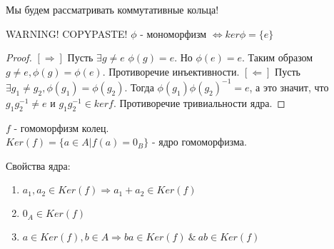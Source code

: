 Мы будем рассматривать коммутативные кольца!

\begin{thm}
WARNING! COPYPASTE!
$ \phi $ - мономорфизм $ \Leftrightarrow ker \phi = \{e\} $
\end{thm}
\begin{proof}
  $ [\Rightarrow] $ Пусть $ \exists g \ne e $ $ \phi(g) = e $. Но $ \phi(e) = e $. Таким образом $ g \ne e, \phi(g) = \phi(e) $. 
  Противоречие инъективности. \newline
  $ [\Leftarrow] $ Пусть $ \exists g_{1} \ne g_{2}, \phi(g_{1}) = \phi(g_{2}) $. Тогда $ \phi(g_{1})\phi(g_{2})^{-1} = e $,
  а это значит, что $ g_{1}g_{2}^{-1} \ne e $ и $ g_{1}g_{2}^{-1} \in ker f $. Противоречие тривиальности ядра. 
\end{proof}

\begin{defn}
$f$ - гомоморфизм колец.\\
$Ker(f) = \{a \in A| f(a) = 0_B\}$ - ядро гомоморфизма.
\end{defn}

Свойства ядра:
\begin{enumerate}
 \item $a_1, a_2 \in Ker(f) \Rightarrow a_1 + a_2 \in Ker(f)$
 \item $0_A \in Ker(f)$
 \item $a \in Ker(f), b \in A \Rightarrow ba \in Ker(f)~\&~ab \in Ker(f)$
\end{enumerate}

